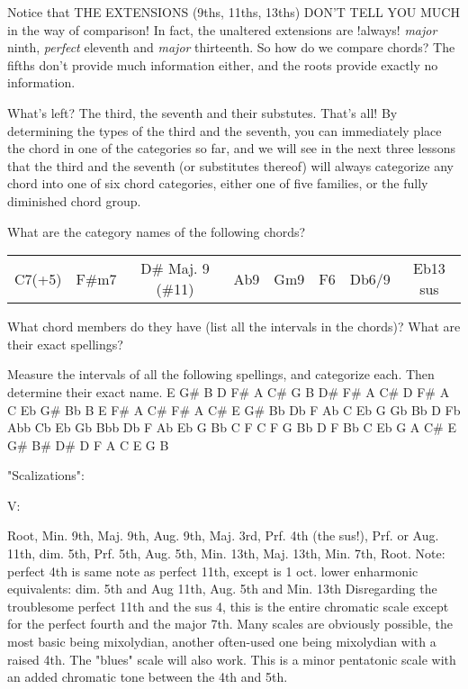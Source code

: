 Notice that THE EXTENSIONS (9ths, 11ths, 13ths) DON'T TELL YOU MUCH in the way
of comparison! In fact, the unaltered extensions are !always! \emph{major} ninth,
\emph{perfect} eleventh and \emph{major} thirteenth. So how do we compare chords? The
fifths don't provide much information either, and the roots provide exactly no
information. 

What's left? The third, the seventh and their substutes. That's all! By
determining the types of the third and the seventh, you can immediately
place the chord in one of the categories so far, and we will see in the
next three lessons that the third and the seventh (or substitutes
thereof) will always categorize any chord into one of six chord
categories, either one of five families, or the fully diminished chord
group.  

What are the category names of the following chords?
\begin{center}
\begin{tabular}{ c c c c c c c c }
C7(+5) & F\#m7 & D\# Maj. 9 (\#11) & Ab9 & Gm9 & F6 & Db6/9 & Eb13 sus\\
\end{tabular}
\end{center}
What chord members do they have (list all the intervals in the chords)?
What are their exact spellings?

Measure the intervals of all the following spellings, and categorize each.
Then determine their exact name.
E G\# B D F\# A C\#
G B D\# F\# A C\#
D F\# A C Eb G\# Bb
B E F\# A C\#
F\# A C\# E G\#
Bb Db F Ab C Eb G
Gb Bb D Fb Abb
Cb Eb Gb Bbb Db F Ab
Eb G Bb C F
C F G Bb D
F Bb C Eb G
A C\# E G\# B\# D\#
D F A C E G B

"Scalizations":

V:

Root, Min. 9th, Maj. 9th, Aug. 9th, Maj. 3rd, Prf. 4th (the sus!), 
Prf. or Aug. 11th, dim. 5th, Prf. 5th, Aug. 5th, Min. 13th, Maj. 13th,
Min. 7th, Root.
Note: perfect 4th is same note as perfect 11th, except is 1 oct. lower
      enharmonic equivalents: dim. 5th and Aug 11th, 
                              Aug. 5th and Min. 13th
Disregarding the troublesome perfect 11th and the sus 4, this is the
entire chromatic scale except for the perfect fourth and the 
major 7th. Many scales are obviously possible, the most basic being 
mixolydian, another often-used one being mixolydian with a raised 4th.
The "blues" scale will also work. This is a minor pentatonic scale with 
an added chromatic tone between the 4th and 5th.

